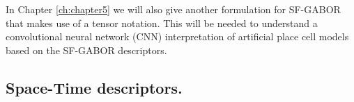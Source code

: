 In Chapter \ref{ch:chapter5} we will also give another formulation for SF-GABOR that makes use of a tensor notation. This will be needed to understand a convolutional neural network (CNN) interpretation of artificial place cell models based on the SF-GABOR descriptors.

\subsection{Space-Time descriptors.}
%
%
